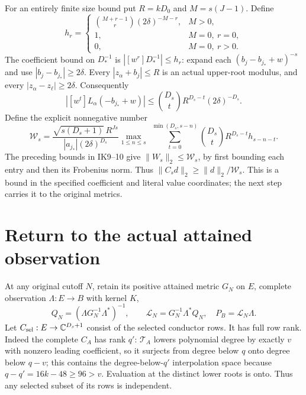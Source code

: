 \documentclass[11pt]{article}
\newcommand{\C}{\mathbb C}
\begin{document}
For an entirely finite size bound put $R=kD_0$ and
$M=s(J-1)$. Define
\[
h_r=\begin{cases}
\binom{M+r-1}{r}(2\delta)^{-M-r},&M>0,\\
1,&M=0,\ r=0,\\0,&M=0,\ r>0.
\end{cases}
\]
The coefficient bound on $D_*^{-1}$ is $|[w^r]D_*^{-1}|\le h_r$:
expand each $(b_j-b_{j_*}+w)^{-s}$ and use
$|b_j-b_{j_*}|\ge2\delta$.
Every $|z_\alpha+b_j|\le R$ is an actual upper-root modulus,
and every $|z_\alpha-z_\ell|\ge2\delta$. Consequently
\[
|[w^t]L_\alpha(-b_{j_*}+w)|
 \le\binom{D_s}{t}R^{D_s-t}(2\delta)^{-D_s}.
\]
Define the explicit nonnegative number
\[
\mathcal W_s=
\frac{\sqrt{s(D_s+1)}\,R^{Js}}
 {|a_{j_*}|(2\delta)^{D_s}}
 \max_{1\le n\le s}\;
 \sum_{t=0}^{\min(D_s,s-n)}
 \binom{D_s}{t}R^{D_s-t}h_{s-n-t}.
\tag{IK11}
\]
The preceding bounds in IK9--10 give $\|W_s\|_2\le\mathcal W_s$,
by first bounding each entry and then its Frobenius norm.
Thus $\|C_sd\|_2\ge\|d\|_2/\mathcal W_s$.
This is a bound in the specified coefficient and literal value coordinates;
the next step carries it to the original metrics.

\section{Return to the actual attained observation}
At any original cutoff $N$, retain its positive attained metric $G_N$
on $E$, complete observation $\Lambda:E\to B$ with kernel $K$,
\[
Q_N=(\Lambda G_N^{-1}\Lambda^*)^{-1},\qquad
\mathcal L_N=G_N^{-1}\Lambda^*Q_N,\quad
P_B=\mathcal L_N\Lambda .
\]
Let $C_{\rm sel}:E\to\C^{D_s+1}$ consist of the selected conductor rows.
It has full row rank. Indeed the complete $C_A$ has rank $q'$:
$\mathcal T_A$ lowers polynomial degree by exactly $v$ with nonzero
leading coefficient, so it surjects from degree below $q$ onto degree
below $q-v$; this contains the degree-below-$q'$ interpolation space
because $q-q'=16k-48\ge96>v$. Evaluation at the distinct lower roots is onto.
Thus any selected subset of its rows is independent.
\end{document}
